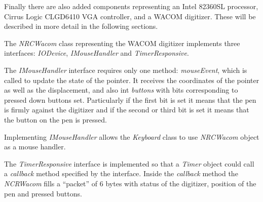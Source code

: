 Finally there are also added components representing an Intel 82360SL
processor, Cirrus Logic CLGD6410 VGA controller, and a WACOM digitizer. These
will be described in more detail in the following sections.


The \emph{NRCWacom} class representing the WACOM digitizer implements three
interfaces: \emph{IODevice}, \emph{IMouseHandler} and \emph{TimerResponsive}.

The \emph{IMouseHandler} interface requires only one method: \emph{mouseEvent},
which is called to update the state of the pointer. It receives the coordinates
of the pointer as well as the displacement, and also int \emph{buttons} with
bits corresponding to pressed down  buttons set. Particularly if the first bit
is set it means that the pen is firmly against the digitizer and if the second
or third bit is set it means that the button on the pen is pressed.

\begin{codeblock}
    
\end{codeblock}


Implementing \emph{IMouseHandler} allows the \emph{Keyboard} class to use
\emph{NRCWacom} object as a mouse handler.

The \emph{TimerResponsive} interface is implemented so that a \emph{Timer}
object could call a \emph{callback} method specified by the interface. Inside
the \emph{callback} method the \emph{NCRWacom} fills a ``packet'' of 6 bytes
with status of the digitizer, position of the pen and pressed buttons.

